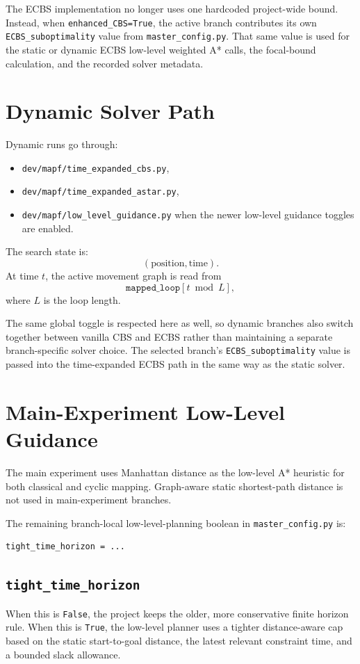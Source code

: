 \documentclass[11pt]{article}
\begin{document}
The ECBS implementation no longer uses one hardcoded project-wide bound. Instead, when \texttt{enhanced\_CBS=True}, the active branch contributes its own \texttt{ECBS\_suboptimality} value from \texttt{master\_config.py}. That same value is used for the static or dynamic ECBS low-level weighted A* calls, the focal-bound calculation, and the recorded solver metadata.

\section{Dynamic Solver Path}

Dynamic runs go through:
\begin{itemize}[leftmargin=2em]
    \item \texttt{dev/mapf/time\_expanded\_cbs.py},
    \item \texttt{dev/mapf/time\_expanded\_astar.py},
    \item \texttt{dev/mapf/low\_level\_guidance.py} when the newer low-level guidance toggles are enabled.
\end{itemize}

The search state is:
\[
(\text{position},\text{time}).
\]
At time $t$, the active movement graph is read from
\[
\texttt{mapped\_loop}[t \bmod L],
\]
where $L$ is the loop length.

The same global toggle is respected here as well, so dynamic branches also switch together between vanilla CBS and ECBS rather than maintaining a separate branch-specific solver choice. The selected branch's \texttt{ECBS\_suboptimality} value is passed into the time-expanded ECBS path in the same way as the static solver.

\section{Main-Experiment Low-Level Guidance}

The main experiment uses Manhattan distance as the low-level A* heuristic for both classical and cyclic mapping. Graph-aware static shortest-path distance is not used in main-experiment branches.

The remaining branch-local low-level-planning boolean in \texttt{master\_config.py} is:
\begin{lstlisting}
tight_time_horizon = ...
\end{lstlisting}

\subsection*{\texttt{tight\_time\_horizon}}
When this is \texttt{False}, the project keeps the older, more conservative finite horizon rule.
When this is \texttt{True}, the low-level planner uses a tighter distance-aware cap based on the static start-to-goal distance, the latest relevant constraint time, and a bounded slack allowance.
\end{document}
